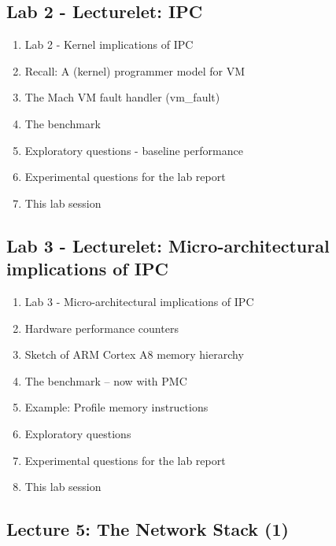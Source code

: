 \documentclass[a4paper,10pt]{article}
\begin{document}
\subsection*{Lab 2 - Lecturelet: IPC}

\begin{enumerate}
  \item Lab 2 - Kernel implications of IPC
  \item Recall: A (kernel) programmer model for VM
  \item The Mach VM fault handler (vm\_fault)
  \item The benchmark
  \item Exploratory questions - baseline performance
  \item Experimental questions for the lab report
  \item This lab session
\end{enumerate}

\subsection*{Lab 3 - Lecturelet: Micro-architectural implications of IPC}

\begin{enumerate}
  \item Lab 3 - Micro-architectural implications of IPC
  \item Hardware performance counters
  \item Sketch of ARM Cortex A8 memory hierarchy
  \item The benchmark -- now with PMC
  \item Example: Profile memory instructions
  \item Exploratory questions
  \item Experimental questions for the lab report
  \item This lab session
\end{enumerate}

\subsection*{Lecture 5: The Network Stack (1)}
\end{document}
